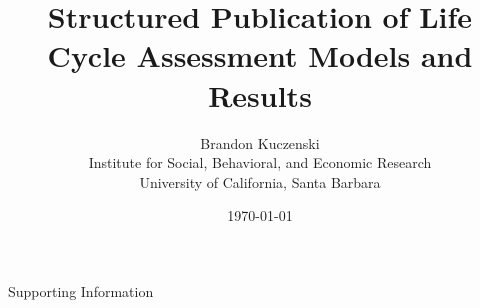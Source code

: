 \documentclass[12pt]{article}
\title{Structured Publication of Life Cycle Assessment Models and Results}
\author{Brandon Kuczenski\\
Institute for Social, Behavioral, and Economic Research\\
University of California, Santa Barbara}
\date{\mydate\today}
\def\mainpaper{

  \maketitle

  

  \doublespacing

  
  
  
  
  
  
  

  

  
  
  
  
  

  

  \singlespacing
  
}
\def\supporting{
  \renewcommand{\thefigure}{S\arabic{figure}}
  \renewcommand{\thetable}{S\arabic{table}}

  \maketitle

  \begin{center}
    \Large Supporting Information
  \end{center}

  \doublespacing

  

  
  
  
  \singlespacing
  
}
\def\unused{
  
}
\begin{document}
\supporting

\end{document}
